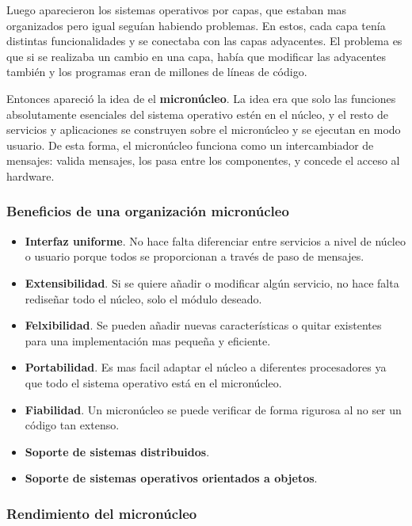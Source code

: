 \documentclass[12pt]{article}
\begin{document}
  Luego aparecieron los sistemas operativos por capas, que estaban mas organizados pero igual seguían habiendo problemas. En estos, cada capa tenía distintas funcionalidades y se conectaba con las capas adyacentes. El problema es que si se realizaba un cambio en una capa, había que modificar las adyacentes también y los programas eran de millones de líneas de código.

  Entonces apareció la idea de el \textbf{micronúcleo}. La idea era que solo las funciones absolutamente esenciales del sistema operativo estén en el núcleo, y el resto de servicios y aplicaciones se construyen sobre el micronúcleo y se ejecutan en modo usuario. De esta forma, el micronúcleo funciona como un intercambiador de mensajes: valida mensajes, los pasa entre los componentes, y concede el acceso al hardware. 

  \subsubsection{Beneficios de una organización micronúcleo}
  \begin{itemize}
    \item \textbf{Interfaz uniforme}. No hace falta diferenciar entre servicios a nivel de núcleo o usuario porque todos se proporcionan a través de paso de mensajes.

    \item \textbf{Extensibilidad}. Si se quiere añadir o modificar algún servicio, no hace falta rediseñar todo el núcleo, solo el módulo deseado.

    \item \textbf{Felxibilidad}. Se pueden añadir nuevas características o quitar existentes para una implementación mas pequeña y eficiente.

    \item \textbf{Portabilidad}. Es mas facil adaptar el núcleo a diferentes procesadores ya que todo el sistema operativo está en el micronúcleo.

    \item \textbf{Fiabilidad}. Un micronúcleo se puede verificar de forma rigurosa al no ser un código tan extenso.

    \item \textbf{Soporte de sistemas distribuidos}. 

    \item \textbf{Soporte de sistemas operativos orientados a objetos}. 
  \end{itemize}

  \subsubsection{Rendimiento del micronúcleo}






  \newpage
  \printbibliography
\end{document}
